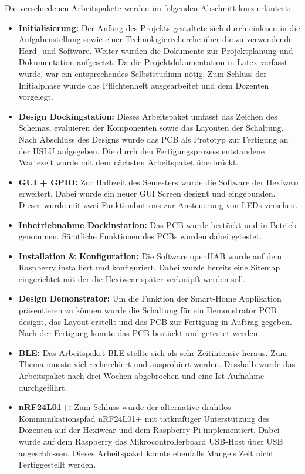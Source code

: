 Die verschiedenen Arbeitspakete werden im folgenden Abschnitt kurz erläutert:
\begin{itemize}
	\item \textbf{Initialisierung:} Der Anfang des Projekts gestaltete sich durch einlesen in die Aufgabenstellung sowie einer Technologierecherche über die zu verwendende Hard- und Software. Weiter wurden die Dokumente zur Projektplanung und Dokumentation aufgesetzt. Da die Projektdokumentation in Latex verfasst wurde, war ein entsprechendes Selbststudium nötig. Zum Schluss der Initialphase wurde das Pflichtenheft ausgearbeitet und dem Dozenten vorgelegt.
	
	\item \textbf{Design Dockingstation:} Dieses Arbeitspaket umfasst das Zeichen des Schemas, evaluieren der Komponenten sowie das Layouten der Schaltung. Nach Abschluss des Designs wurde das PCB als Prototyp zur Fertigung an der HSLU aufgegeben. Die durch den Fertigungsprozess entstandene Wartezeit wurde mit dem nächsten Arbeitspaket überbrückt.
	
	\item \textbf{GUI + GPIO:} Zur Halbzeit des Semesters wurde die Software der Hexiwear erweitert. Dabei wurde ein neuer GUI Screen designt und eingebunden. Dieser wurde mit zwei Funktionbuttons zur Ansteuerung von LEDs versehen.
	
	\item \textbf{Inbetriebnahme Dockinstation:} Das PCB wurde bestückt und in Betrieb genommen. Sämtliche Funktionen des PCBs wurden dabei getestet.
	
	\item \textbf{Installation \& Konfiguration:} Die Software openHAB wurde auf dem Raspberry installiert und konfiguriert. Dabei wurde bereits eine Sitemap eingerichtet mit der die Hexiwear später verknüpft werden soll.
	
	\item \textbf{Design Demonstrator:} Um die Funktion der Smart-Home Applikation präsentieren zu können wurde die Schaltung für ein Demonstrator PCB designt, das Layout erstellt und das PCB zur Fertigung in Auftrag gegeben. Nach der Fertigung konnte das PCB bestückt und getestet werden.
	
	\item \textbf{BLE:} Das Arbeitspaket BLE stellte sich als sehr Zeitintensiv heraus. Zum Thema musste viel recherchiert und ausprobiert werden. Desshalb wurde das Arbeitspaket nach drei Wochen abgebrochen und eine Ist-Aufnahme durchgeführt.
	
	\item \textbf{nRF24L01+:} Zum Schluss wurde der alternative drahtlos Kommunikationspfad nRF24L01+ mit tatkräftiger Unterstützung des Dozenten auf der Hexiwear und dem Raspberry Pi implementiert. Dabei wurde auf dem Raspberry das Mikrocontrollerboard USB-Host über USB angeschlossen. Dieses Arbeitspaket konnte ebenfalls Mangels Zeit nicht Fertiggestellt werden.
\end{itemize}